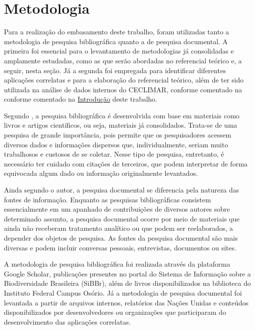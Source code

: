 \chapter{Metodologia}\label{metodologia}
Para a realização do embasamento deste trabalho, foram utilizadas tanto a metodologia de pesquisa bibliográfica 
quanto a de pesquisa documental. A primeira foi essencial para o levantamento de metodologias já consolidadas e 
amplamente estudadas, como as que serão abordadas no referencial teórico e, a seguir, nesta seção. Já a segunda 
foi empregada para identificar diferentes aplicações correlatas e para a elaboração do referencial teórico, além 
de ter sido utilizada na análise de dados internos do CECLIMAR, conforme comentado na conforme comentado na 
\hyperref[chapter:intro]{Introdução} deste trabalho.

Segundo , a pesquisa bibliográfica é desenvolvida com base em materiais como livros 
e artigos científicos, ou seja, materiais já consolidados. Trata-se de uma pesquisa de grande importância, pois 
permite que os pesquisadores acessem diversos dados e informações dispersos que, individualmente, seriam muito 
trabalhosos e custosos de se coletar. Nesse tipo de pesquisa, entretanto, é necessário ter cuidado com citações 
de terceiros, que podem interpretar de forma equivocada algum dado ou informação originalmente levantados.

Ainda segundo o autor, a pesquisa documental se diferencia pela natureza das fontes de informação. Enquanto as 
pesquisas bibliográficas consistem essencialmente em um apanhado de contribuições de diversos autores sobre 
determinado assunto, a pesquisa documental ocorre por meio de materiais que ainda não receberam tratamento 
analítico ou que podem ser reelaborados, a depender dos objetos de pesquisa. As fontes da pesquisa documental 
são mais diversas e podem incluir conversas pessoais, entrevistas, documentos ou sites.

A metodologia de pesquisa bibliográfica foi realizada através da plataforma Google Scholar, publicações 
presentes no portal do Sistema de Informação sobre a Biodiversidade Brasileira (SiBBr), além de livros 
disponibilizados na biblioteca do Instituto Federal Campus Osório. Já a metodologia de pesquisa documental 
foi levantada a partir de arquivos internos, relatórios das Nações Unidas e conteúdos disponibilizados por 
desenvolvedores ou organizações que participaram do desenvolvimento das aplicações correlatas.

